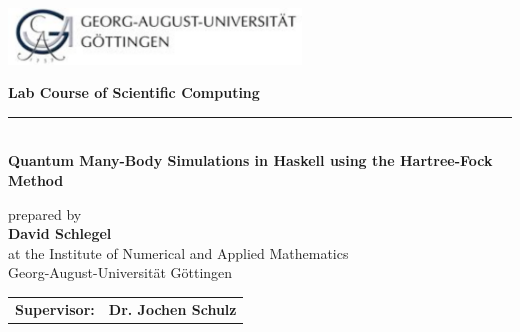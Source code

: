 \begin{titlepage}
\noindent\begin{minipage}[t]{0.5\textwidth}
      \includegraphics[height=1.5cm]{figures/Logo_Uni_Goettingen}
\end{minipage}\par
\vspace{1cm}
   \vspace*{1.5cm}
   \centering
%  
  {\Large \textbf{Lab Course of Scientific Computing}}\\ \rule{1.0\textwidth}{0.4pt}\\ [2cm]
  {\LARGE \textbf{Quantum Many-Body Simulations in Haskell using the Hartree-Fock Method}}\\[0.5cm]
\vspace{3cm}

prepared by\\[0.3cm]
{\large \textbf{David Schlegel}}\\[0.6cm]
at the Institute of Numerical and Applied Mathematics\\
Georg-August-Universität Göttingen
\vspace{4cm}

\vspace{1.0cm}
\begin{tabular}{ll}
\textbf{Supervisor:}& \textbf{Dr. Jochen Schulz}
\end{tabular}

\end{titlepage}
\onehalfspacing
\cleardoublepage
\setcounter{page}{0}
\tableofcontents
\thispagestyle{empty}
\newpage
